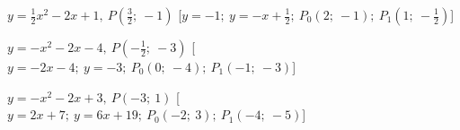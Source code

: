 \begin{esercizio}
\begin{enumeratea}
  \item  $y=\frac{1}{2} x^2 -2 x +1,~P \left (\frac{3}{2};~-1 \right )$
   \hfill [$y = -1;~y = - x +\frac{1}{2};~P_0 \left (2;~-1 \right );~P_1 \left (1;~-\frac{1}{2} \right )$]
  \item  $y=- x^2 -2 x -4,~P \left (-\frac{1}{2};~-3 \right )$
   \hfill [$y = -2 x -4;~y = -3;~P_0 \left (0;~-4 \right );~P_1 \left (-1;~-3 \right )$]
  \item  $y=- x^2 -2 x +3,~P \left (-3;~1 \right )$
   \hfill [$y = 2 x +7;~y = 6 x +19;~P_0 \left (-2;~3 \right );~P_1 \left (-4;~-5 \right )$]
 \end{enumeratea}
\end{esercizio}


